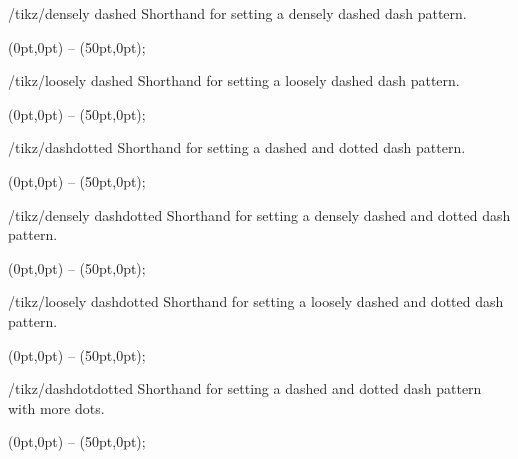 \begin{stylekey}{/tikz/densely dashed}
  Shorthand for setting a densely dashed dash pattern.

\begin{codeexample}[]
\tikz {} (0pt,0pt) -- (50pt,0pt);
\end{codeexample}
\end{stylekey}

\begin{stylekey}{/tikz/loosely dashed}
  Shorthand for setting a loosely dashed dash pattern.

\begin{codeexample}[]
\tikz {} (0pt,0pt) -- (50pt,0pt);
\end{codeexample}
\end{stylekey}


\begin{stylekey}{/tikz/dashdotted}
  Shorthand for setting a dashed and dotted dash pattern.

\begin{codeexample}[]
\tikz \draw[dashdotted] (0pt,0pt) -- (50pt,0pt);
\end{codeexample}
\end{stylekey}

\begin{stylekey}{/tikz/densely dashdotted}
  Shorthand for setting a densely dashed and dotted dash pattern.

\begin{codeexample}[]
\tikz {} (0pt,0pt) -- (50pt,0pt);
\end{codeexample}
\end{stylekey}

\begin{stylekey}{/tikz/loosely dashdotted}
  Shorthand for setting a loosely dashed and dotted dash pattern.

\begin{codeexample}[]
\tikz {} (0pt,0pt) -- (50pt,0pt);
\end{codeexample}
\end{stylekey}


\begin{stylekey}{/tikz/dashdotdotted}
  Shorthand for setting a dashed and dotted dash pattern with more dots.

\begin{codeexample}[]
\tikz \draw[dashdotdotted] (0pt,0pt) -- (50pt,0pt);
\end{codeexample}
\end{stylekey}


